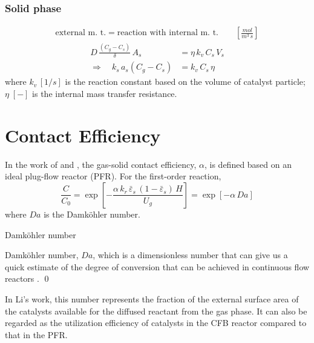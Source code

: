 \subsubsection{Solid phase}
\begin{align*}
    \text{external m. t.}
    = 
    \text{reaction with internal m. t.}
    \qquad \left[\si{\frac{mol}{m^3\, s}}\right]
\end{align*}
\begin{align}
    D\, \frac{(C_g - C_s)}{\delta}\, A_s
    &= \eta \, k_v \, C_s \, V_s \\
    \Longrightarrow \quad 
    k_s \, a_s (C_g - C_s) 
    &= k_v \, C_s \, \eta 
\end{align}
where $k_v\, [\si{1/s}]$ is the reaction constant based on the volume of catalyst particle; $\eta\; [-]$ is the internal mass transfer resistance.



\newpage
%

\section{Contact Efficiency}
In the work of \citet{li2011catalytic} and \citet{li2013catalytic}, the gas-solid contact efficiency, $\alpha$, is defined based on an ideal plug-flow reactor (PFR).
For the first-order reaction,
\begin{equation}
    \frac{C}{C_0}
    = \exp\left[
        -\frac{\alpha\,k_r\,\bar{\varepsilon}_s\, (1-\bar{\varepsilon}_s)\,H}{U_g}
        \right]
    = \exp\left[ -\alpha\,Da \right]
\end{equation}
where $Da$ is the Damköhler number.

\begin{definition}
    Damköhler number

    Damköhler number, $Da$, which is a dimensionless number that can give us a quick estimate of the degree of conversion that can be achieved in continuous flow reactors \citep{fogler2016element}.
    \qed
\end{definition}

In Li's work, this number represents the fraction of the external surface area of the catalysts available for the diffused reactant from the gas phase.
It can also be regarded as the utilization efficiency of catalysts in the CFB reactor compared to that in the PFR.

